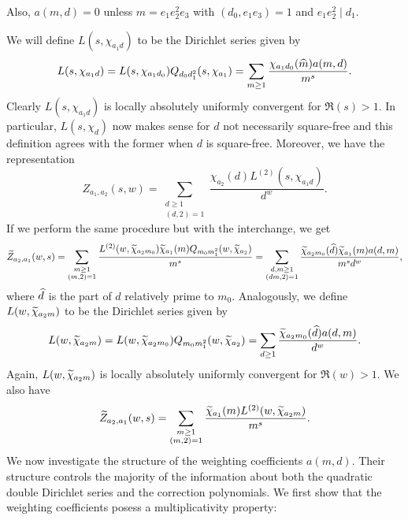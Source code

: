     \begin{remark}\label{NFrem:weighting_coefficient_remark}
        Also, $a(m,d) = 0$ unless $m = e_{1}e_{2}^{2}e_{3}$ with $(d_{0},e_{1}e_{3}) = 1$ and $e_{1}e_{2}^{2} \mid d_{1}$.
    \end{remark}

    We will define $L(s,\chi_{a_{1}d})$ to be the Dirichlet series given by
    \[
        L(s,\chi_{a_{1}d}) = L(s,\chi_{a_{1}d_{0}})Q_{d_{0}d_{1}^{2}}(s,\chi_{a_{1}}) = \sum_{m \ge 1}\frac{\chi_{a_{1}d_{0}}(\widehat{m})a(m,d)}{m^{s}}.
    \]
    Clearly $L(s,\chi_{a_{1}d})$ is locally absolutely uniformly convergent for $\Re(s) > 1$. In particular, $L(s,\chi_{d})$ now makes sense for $d$ not necessarily square-free and this definition agrees with the former when $d$ is square-free. Moreover, we have the representation
    \[
        Z_{a_{1},a_{2}}(s,w) = \sum_{\substack{d \ge 1 \\ (d,2) = 1}}\frac{\chi_{a_{2}}(d)L^{(2)}(s,\chi_{a_{1}d})}{d^{w}}.
    \]
    If we perform the same procedure but with the interchange, we get
    \[
        \widetilde{Z}_{a_{2},a_{1}}(w,s) = \sum_{\substack{m \ge 1 \\ (m,2) = 1}}\frac{L^{(2)}(w,\widetilde{\chi}_{a_{2}m_{0}})\widetilde{\chi}_{a_{1}}(m)Q_{m_{0}m_{1}^{2}}(w,\widetilde{\chi}_{a_{2}})}{m^{s}} = \sum_{\substack{d,m \ge 1 \\ (dm,2) = 1}}\frac{\widetilde{\chi}_{a_{2}m_{0}}(\widehat{d})\widetilde{\chi}_{a_{1}}(m)a(d,m)}{m^{s}d^{w}},
    \]
    where $\widehat{d}$ is the part of $d$ relatively prime to $m_{0}$. Analogously, we define $L(w,\widetilde{\chi}_{a_{2}m})$ to be the Dirichlet series given by
    \[
        L(w,\widetilde{\chi}_{a_{2}m}) = L(w,\widetilde{\chi}_{a_{2}m_{0}})Q_{m_{0}m_{1}^{2}}(w,\widetilde{\chi}_{a_{2}}) = \sum_{d \ge 1}\frac{\widetilde{\chi}_{a_{2}m_{0}}(\widehat{d})a(d,m)}{d^{w}}.
    \]
    Again, $L(w,\widetilde{\chi}_{a_{2}m})$ is locally absolutely uniformly convergent for $\Re(w) > 1$. We also have
    \[
        \widetilde{Z}_{a_{2},a_{1}}(w,s) = \sum_{\substack{m \ge 1 \\ (m,2) = 1}}\frac{\widetilde{\chi}_{a_{1}}(m)L^{(2)}(w,\widetilde{\chi}_{a_{2}m})}{m^{s}}.
    \]
    We now investigate the structure of the weighting coefficients $a(m,d)$. Their structure controls the majority of the information about both the quadratic double Dirichlet series and the correction polynomials. We first show that the weighting coefficients posess a multiplicativity property:

